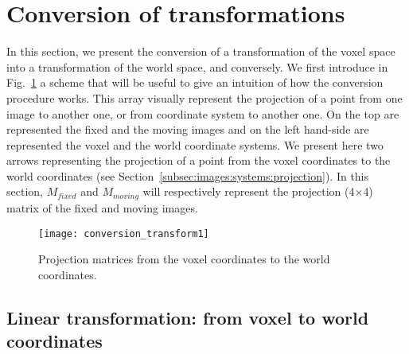 \section{Conversion of transformations}


In this section, we present the conversion of a transformation of the voxel space into a transformation of the world space, and conversely. We first introduce in Fig.~\ref{fig:tools:conv:1} a scheme that will be useful to give an intuition of how the conversion procedure works. This array visually represent the projection of a point from one image to another one, or from coordinate system to another one. On the top are represented the fixed and the moving images and on the left hand-side are represented the voxel and the world coordinate systems. We present here two arrows representing the projection of a point from the voxel coordinates to the world coordinates (see Section~\ref{subsec:images:systems:projection}). In this section, $M_{fixed}$ and $M_{moving}$  will respectively represent the projection (4$\times$4) matrix of the fixed and moving images.

\begin{figure}[!htbp]
\centering
\texttt{[image: conversion\_transform1]}
\caption{Projection matrices from the voxel coordinates to the world coordinates.}
\label{fig:tools:conv:1}
\end{figure}



\subsection{Linear transformation: from voxel to world coordinates}


